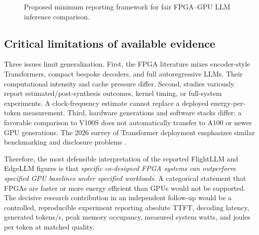 \documentclass[conference,10pt]{IEEEtran}
\begin{document}
\begin{figure}[t]
\centering
{}
\caption{Proposed minimum reporting framework for fair FPGA--GPU LLM inference comparison.}
\label{fig:tradeoff}
\end{figure}

\subsection{Critical limitations of available evidence}
Three issues limit generalization. First, the FPGA literature mixes encoder-style Transformers, compact bespoke decoders, and full autoregressive LLMs. Their computational intensity and cache pressure differ. Second, studies variously report estimated/post-synthesis outcomes, kernel timing, or full-system experiments. A clock-frequency estimate cannot replace a deployed energy-per-token measurement. Third, hardware generations and software stacks differ; a favorable comparison to V100S does not automatically transfer to A100 or newer GPU generations. The 2026 survey of Transformer deployment emphasizes similar benchmarking and disclosure problems \cite{blankestijn2026}.

Therefore, the most defensible interpretation of the reported FlightLLM and EdgeLLM figures is that \emph{specific co-designed FPGA systems can outperform specified GPU baselines under specified workloads}. A categorical statement that FPGAs are faster or more energy efficient than GPUs would not be supported. The decisive research contribution in an independent follow-up would be a controlled, reproducible experiment reporting absolute TTFT, decoding latency, generated tokens/s, peak memory occupancy, measured system watts, and joules per token at matched quality.
\end{document}
